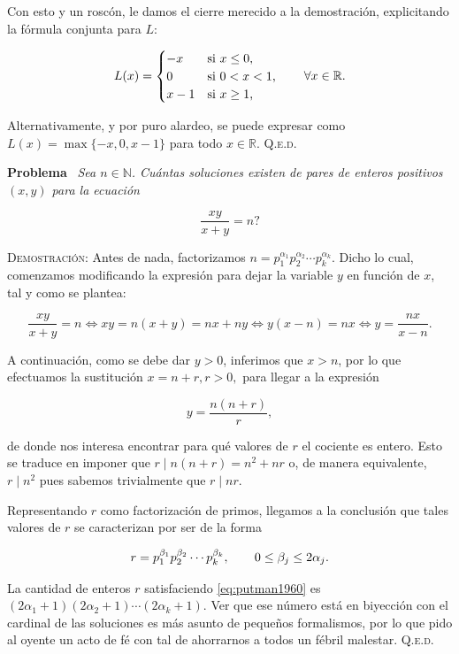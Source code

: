 \documentclass{article}
\begin{document}
Con esto y un roscón, le damos el cierre merecido a la demostración, explicitando la fórmula conjunta para $L$:

\[
L(x) =
\begin{cases}
    -x & \text{si $x \leq 0$,} \\
    0 & \text{si $0 < x < 1$,} \\
    x - 1 & \text{si $x \geq 1$,}
\end{cases}
\hspace{20px} \forall x \in \mathbb{R}.
\]

\noindent Alternativamente, y por puro alardeo, se puede expresar como $L(x) = \max\{-x, 0, x - 1\}$ para todo $x \in \mathbb{R}$. \hfill{\textsc{Q.e.d.}}

\vspace{12px}

\noindent\textbf{Problema} \, \textit{Sea $n \in \mathbb{N}$. Cuántas soluciones existen de pares de enteros positivos $(x, y)$ para la ecuación} 

\[\frac{xy}{x+y} = n\textit{?}\]

\noindent\textsc{Demostración}: Antes de nada, factorizamos $n = p_1^{\alpha_1}p_2^{\alpha_2}\cdots p_k^{\alpha_k}$. Dicho lo cual, comenzamos modificando la expresión para dejar la variable $y$ en función de $x$, tal y como se plantea:

\[\frac{xy}{x+y} = n \iff xy = n(x+y) = nx + ny \iff y(x-n) = nx \iff y = \frac{nx}{x-n}.\]

A continuación, como se debe dar $y > 0$, inferimos que $x > n$, por lo que efectuamos la sustitución $x = n + r, r > 0,$ para llegar a la expresión

\[y = \frac{n(n+r)}{r},\]

\noindent de donde nos interesa encontrar para qué valores de $r$ el cociente es entero. Esto se traduce en imponer que $r \mid n(n+r) = n^2 + nr$ o, de manera equivalente, $r \mid n^2$ pues sabemos trivialmente que $r \mid nr$.

Representando $r$ como factorización de primos, llegamos a la conclusión que tales valores de $r$ se caracterizan por ser de la forma

\begin{equation}
    r = p_1^{\beta_1}p_2^{\beta_2}\cdots p_k^{\beta_k}, \hspace{20px} 0 \leq \beta_j \leq 2\alpha_j.
    \label{eq:putman1960}
\end{equation}

\noindent La cantidad de enteros $r$ satisfaciendo \eqref{eq:putman1960} es $(2\alpha_1 + 1)(2\alpha_2 + 1)\cdots(2\alpha_k + 1)$. Ver que ese número está en biyección con el cardinal de las soluciones es más asunto de pequeños formalismos, por lo que pido al oyente un acto de fé con tal de ahorrarnos a todos un fébril malestar. \hfill{\textsc{Q.e.d.}}
\end{document}
